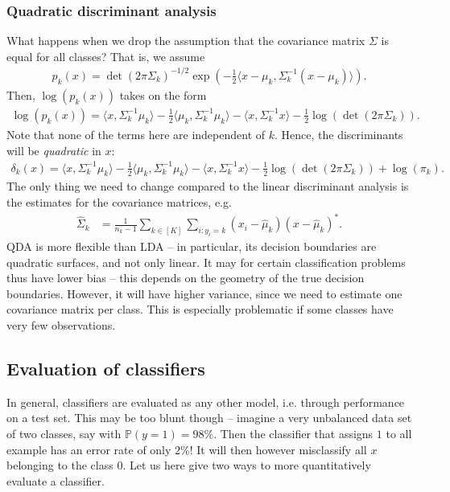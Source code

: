 \documentclass{article}
\newcommand{\sprod}[1]{\langle #1 \rangle}
\begin{document}
\subsubsection{Quadratic discriminant analysis} What happens when we drop the assumption that the covariance matrix $\Sigma$ is equal for all classes? That is, we assume 
\begin{align*}
    p_k(x) = \det(2\pi\Sigma_k)^{-1/2} \exp( -\tfrac{1}{2}\sprod{x-\mu_k,\Sigma_k^{-1}(x-\mu_k)}).
\end{align*}
Then, $\log(p_k(x))$ takes on the form
\begin{align*}
    \log(p_k(x)) =  \sprod{x,\Sigma_k^{-1}\mu_k} -\tfrac{1}{2}\sprod{\mu_k,\Sigma_k^{-1}\mu_k}-\sprod{x,\Sigma_k^{-1}x}- \tfrac{1}{2}\log(\det(2\pi\Sigma_k)).
\end{align*}
Note that none of the terms here are independent of $k$. Hence, the discriminants will be \emph{quadratic} in $x$:
\begin{align*}
     \delta_k(x) = \sprod{x,\Sigma_k^{-1}\mu_k} -\tfrac{1}{2}\sprod{\mu_k,\Sigma_k^{-1}\mu_k}-\sprod{x,\Sigma_k^{-1}x}- \tfrac{1}{2}\log(\det(2\pi\Sigma_k)) +\log(\pi_k).
\end{align*}
The only thing we need to change compared to the linear discriminant analysis is the estimates for the covariance matrices, e.g.
\begin{align*}
     \widehat{\Sigma}_k &= \frac{1}{n_k-1}\sum_{k\in [K]} \sum_{i : y_i =k}(x_i-\hat{\mu}_k)(x-\hat{\mu}_k)^*.
\end{align*}
QDA is more flexible than LDA -- in particular, its decision boundaries are quadratic surfaces, and not only linear. It may for certain classification problems thus have lower bias -- this depends on the geometry of the true decision boundaries. However, it will have higher variance, since we need to estimate one covariance matrix per class. This is especially problematic if some classes have very few observations.


\subsection{Evaluation of classifiers}
In general, classifiers are evaluated as any other model, i.e. through performance on a test set. This may be too blunt though -- imagine a very unbalanced data set of two classes, say with $\mathbb{P}(y=1)=98\%$. Then the classifier that assigns $1$ to all example has an error rate of only $2\%$! It will then however misclassify all $x$ belonging to the class $0$. Let us here give two ways to more quantitatively evaluate a classifier.
\end{document}
